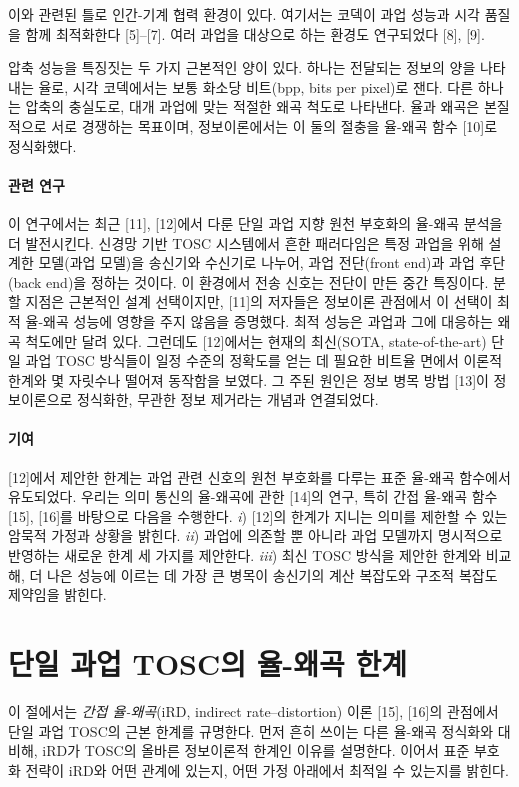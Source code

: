 이와 관련된 틀로 인간-기계 협력 환경이 있다. 여기서는 코덱이 과업 성능과 시각 품질을 함께 최적화한다 [5]--[7]. 여러 과업을 대상으로 하는 환경도 연구되었다 [8], [9].

압축 성능을 특징짓는 두 가지 근본적인 양이 있다. 하나는 전달되는 정보의 양을 나타내는 율로, 시각 코덱에서는 보통 화소당 비트(bpp, bits per pixel)로 잰다. 다른 하나는 압축의 충실도로, 대개 과업에 맞는 적절한 왜곡 척도로 나타낸다. 율과 왜곡은 본질적으로 서로 경쟁하는 목표이며, 정보이론에서는 이 둘의 절충을 율-왜곡 함수 [10]로 정식화했다.

\paragraph{관련 연구}
이 연구에서는 최근 [11], [12]에서 다룬 단일 과업 지향 원천 부호화의 율-왜곡 분석을 더 발전시킨다. 신경망 기반 TOSC 시스템에서 흔한 패러다임은 특정 과업을 위해 설계한 모델(과업 모델)을 송신기와 수신기로 나누어, 과업 전단(front end)과 과업 후단(back end)을 정하는 것이다. 이 환경에서 전송 신호는 전단이 만든 중간 특징이다. 분할 지점은 근본적인 설계 선택이지만, [11]의 저자들은 정보이론 관점에서 이 선택이 최적 율-왜곡 성능에 영향을 주지 않음을 증명했다. 최적 성능은 과업과 그에 대응하는 왜곡 척도에만 달려 있다. 그런데도 [12]에서는 현재의 최신(SOTA, state-of-the-art) 단일 과업 TOSC 방식들이 일정 수준의 정확도를 얻는 데 필요한 비트율 면에서 이론적 한계와 몇 자릿수나 떨어져 동작함을 보였다. 그 주된 원인은 정보 병목 방법 [13]이 정보이론으로 정식화한, 무관한 정보 제거라는 개념과 연결되었다.

\paragraph{기여}
[12]에서 제안한 한계는 과업 관련 신호의 원천 부호화를 다루는 표준 율-왜곡 함수에서 유도되었다. 우리는 의미 통신의 율-왜곡에 관한 [14]의 연구, 특히 간접 율-왜곡 함수 [15], [16]를 바탕으로 다음을 수행한다. \emph{i}) [12]의 한계가 지니는 의미를 제한할 수 있는 암묵적 가정과 상황을 밝힌다. \emph{ii}) 과업에 의존할 뿐 아니라 과업 모델까지 명시적으로 반영하는 새로운 한계 세 가지를 제안한다. \emph{iii}) 최신 TOSC 방식을 제안한 한계와 비교해, 더 나은 성능에 이르는 데 가장 큰 병목이 송신기의 계산 복잡도와 구조적 복잡도 제약임을 밝힌다.

\section{단일 과업 TOSC의 율-왜곡 한계}
이 절에서는 \emph{간접 율-왜곡}(iRD, indirect rate--distortion) 이론 [15], [16]의 관점에서 단일 과업 TOSC의 근본 한계를 규명한다. 먼저 흔히 쓰이는 다른 율-왜곡 정식화와 대비해, iRD가 TOSC의 올바른 정보이론적 한계인 이유를 설명한다. 이어서 표준 부호화 전략이 iRD와 어떤 관계에 있는지, 어떤 가정 아래에서 최적일 수 있는지를 밝힌다.

